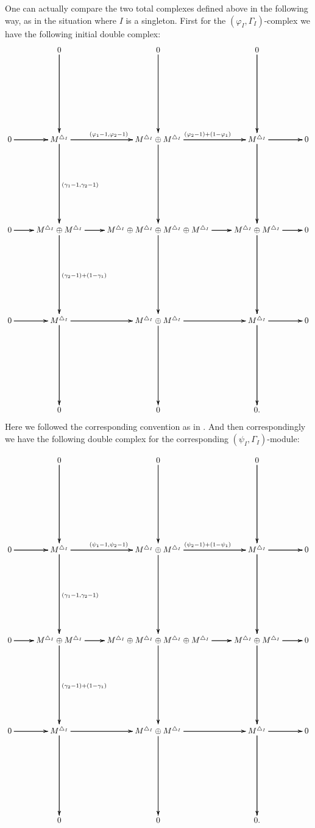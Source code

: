 \documentclass[12pt]{amsart}
\theoremstyle{definition}
\numberwithin{equation}{section}
\begin{document}
\indent One can actually compare the two total complexes defined above in the following way, as in the situation where $I$ is a singleton. First for the $(\varphi_I,\Gamma_I)$-complex we have the following initial double complex:
\[
\xymatrix@R+6pc@C+0pc{
 &0\ar[d] \ar[d] \ar[d]  &0 \ar[d] \ar[d] \ar[d]  & 0 \ar[d] \ar[d] \ar[d] \\
0\ar[r] \ar[r] \ar[r] &M^{\triangle_I}\ar[d]^{(\gamma_1-1,\gamma_2-1)} \ar[d] \ar[d] \ar[r]^{(\varphi_1-1,\varphi_2-1)} \ar[r] \ar[r] &M^{\triangle_I}\oplus M^{\triangle_I}\ar[d] \ar[d] \ar[d]\ar[r]^{(\varphi_2-1)+(1-\varphi_1)} \ar[r] \ar[r]  & M^{\triangle_I}\ar[d] \ar[d] \ar[d] \ar[r] \ar[r] \ar[r] &0\\
0\ar[r] \ar[r] \ar[r] &M^{\triangle_I}\oplus M^{\triangle_I}\ar[d]^{(\gamma_2-1)+(1-\gamma_1)} \ar[d] \ar[d] \ar[r] \ar[r] \ar[r] &M^{\triangle_I}\oplus M^{\triangle_I}\oplus M^{\triangle_I}\oplus M^{\triangle_I}\ar[d] \ar[d] \ar[d]\ar[r] \ar[r] \ar[r]  & M^{\triangle_I}\oplus M^{\triangle_I}\ar[d] \ar[d] \ar[d] \ar[r] \ar[r] \ar[r] &0\\
0\ar[r] \ar[r] \ar[r] &M^{\triangle_I}\ar[d] \ar[d] \ar[d] \ar[r] \ar[r] \ar[r] &M^{\triangle_I}\oplus M^{\triangle_I}\ar[d] \ar[d] \ar[d]\ar[r] \ar[r] \ar[r]  & M^{\triangle_I}\ar[d] \ar[d] \ar[d] \ar[r] \ar[r] \ar[r] &0\\
&0 &0  & 0
.}
\]
Here we followed the corresponding convention as in \cite{KPX}. And then correspondingly we have the following double complex for the corresponding $(\psi_I,\Gamma_I)$-module:
\begin{center}
\[
\xymatrix@R+6pc@C+0pc{
 &0\ar[d] \ar[d] \ar[d]  &0 \ar[d] \ar[d] \ar[d]  & 0 \ar[d] \ar[d] \ar[d] \\
0\ar[r] \ar[r] \ar[r] &M^{\triangle_I}\ar[d]^{(\gamma_1-1,\gamma_2-1)} \ar[d] \ar[d] \ar[r]^{(\psi_1-1,\psi_2-1)} \ar[r] \ar[r] &M^{\triangle_I}\oplus M^{\triangle_I}\ar[d] \ar[d] \ar[d]\ar[r]^{(\psi_2-1)+(1-\psi_1)} \ar[r] \ar[r]  & M^{\triangle_I}\ar[d] \ar[d] \ar[d] \ar[r] \ar[r] \ar[r] &0\\
0\ar[r] \ar[r] \ar[r] &M^{\triangle_I}\oplus M^{\triangle_I}\ar[d]^{(\gamma_2-1)+(1-\gamma_1)} \ar[d] \ar[d] \ar[r] \ar[r] \ar[r] &M^{\triangle_I}\oplus M^{\triangle_I}\oplus M^{\triangle_I}\oplus M^{\triangle_I}\ar[d] \ar[d] \ar[d]\ar[r] \ar[r] \ar[r]  & M^{\triangle_I}\oplus M^{\triangle_I}\ar[d] \ar[d] \ar[d] \ar[r] \ar[r] \ar[r] &0\\
0\ar[r] \ar[r] \ar[r] &M^{\triangle_I}\ar[d] \ar[d] \ar[d] \ar[r] \ar[r] \ar[r] &M^{\triangle_I}\oplus M^{\triangle_I}\ar[d] \ar[d] \ar[d]\ar[r] \ar[r] \ar[r]  & M^{\triangle_I}\ar[d] \ar[d] \ar[d] \ar[r] \ar[r] \ar[r] &0\\
&0 &0  & 0
.}
\]
\end{center}
\end{document}
